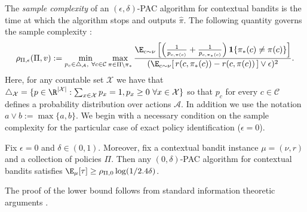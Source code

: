 \documentclass{article}
\newcommand{\mc}[1]{\mathcal{#1}}
\newcommand{\1}{\mathbf{1}}
\renewcommand{\v}{r} %
\begin{document}
\noindent The \emph{sample complexity} of an $(\epsilon,\delta)$-PAC algorithm for contextual bandits is the time at which the algorithm stops and outputs $\widehat{\pi}$.
The following quantity governs the sample complexity :
\begin{align}
    \rho_{\Pi,\epsilon}(\Pi, v) := \min_{p_c \in \triangle_{\mc{A}}, \ \forall c \in \mc{C} }  \max_{\pi \in \Pi \setminus \pi_* } \frac{ \E_{c \sim \nu} \left[ \left(\frac{1}{p_{c,\pi(c)}}+ \frac{1}{p_{c,\pi_*(c)}}\right) \1\{\pi_*(c) \neq \pi(c) \} \right] }{(\E_{c \sim \nu}[ \, \v(c,\pi_*(c)) - \v(c,\pi(c)) \, ] \vee \epsilon)^2}. \label{eqn:rho_star_combinatorial}
\end{align}
Here, for any countable set $\mc{X}$ we have that $\triangle_{\mc{X}} = \{ p \in \R^{|\mc{X}|} : \sum_{x \in \mc{X}} p_x = 1, p_x \geq 0 \ \forall x \in \mc{X} \}$ so that $p_c$ for every $c \in \mc{C}$ defines a probability distribution over actions $\mc{A}$. In addition we use the notation $a \vee b := \max\{a,b\}$. 
We begin with a necessary condition on the sample complexity for the particular case of exact policy identification ($\epsilon=0$).
\begin{theorem}\label{thm:lower_bound}
Fix $\epsilon=0$ and $\delta \in (0,1)$. 
Moreover, fix a contextual bandit instance $\mu = (\nu,r)$ and a collection of policies $\Pi$.
Then any $(0,\delta)$-PAC algorithm for contextual bandits satisfies $\E_\mu[\tau] \geq \rho_{\Pi,0} \log(1/2.4 \delta)$.
\end{theorem}
\noindent The proof of the lower bound follows from standard information theoretic arguments \cite{kaufmann2016complexity}.
\end{document}
